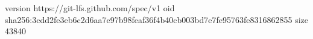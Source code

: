 version https://git-lfs.github.com/spec/v1
oid sha256:3cdd2fe3eb6c2d6aa7e97b98feaf36f4b40cb003bd7e7fe95763fe8316862855
size 43840
